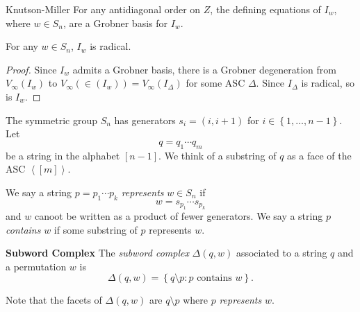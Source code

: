 \documentclass[co439]{subfiles}
\begin{document}
    \begin{theorem}{Knutson-Miller}
        For any antidiagonal order on $Z$, the defining equations of $I_w$, where $w\in S_n$, are a Grobner basis for $I_w$.
    \end{theorem}

    \rruleline

    \begin{cor}{}
        For any $w\in S_n$, $I_w$ is radical.
    \end{cor}	

    \begin{proof}
        Since $I_w$ admits a Grobner basis, there is a Grobner degeneration from $V_{\infty}\left( I_w \right)$ to $V_{\infty}\left( \in\left( I_w \right) \right) = V_{\infty}\left( I_{\Delta} \right)$ for some ASC $\Delta$. Since $I_{\Delta}$ is radical, so is $I_w$.
    \end{proof}

    \np The symmetric group $S_n$ has generators $s_i = \left( i,i+1 \right)$ for $i\in\left\lbrace 1,\ldots,n-1 \right\rbrace$. Let
    \begin{equation*}
        q = q_1\cdots q_m
    \end{equation*}
    be a string in the alphabet $\left[ n-1 \right]$. We think of a substring of $q$ as a face of the ASC $\left< \left[ m \right] \right>$. 

    We say a string $p = p_1\cdots p_k$ \textit{represents} $w\in S_n$ if
    \begin{equation*}
        w = s_{p_1}\cdots s_{p_k}
    \end{equation*}
    and $w$ canoot be written as a product of fewer generators. We say a string $p$ \textit{contains} $w$ if some substring of $p$ represents $w$.

    \begin{definition}{\textbf{Subword Complex}}
        The \emph{subword complex} $\Delta\left( q,w \right)$ associated to a string $q$ and a permutation $w$ is
        \begin{equation*}
            \Delta\left( q,w \right) = \left\lbrace q\setminus p: p\text{ contains }w \right\rbrace.
        \end{equation*}
    \end{definition}

    \np Note that the facets of $\Delta\left( q,w \right)$ are $q\setminus p$ where $p$ \textit{represents} $w$.
\end{document}
